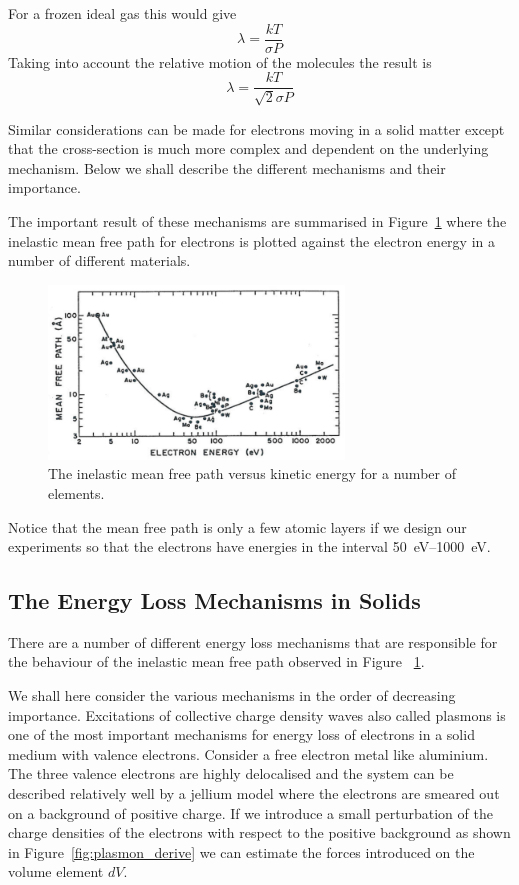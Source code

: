 For a frozen ideal gas this would give
\begin{equation}
\lambda = \frac{kT}{\sigma P}
\end{equation}
Taking into account the relative motion of the molecules the result is
\begin{equation}
\lambda = \frac{kT}{\sqrt{2} \sigma P}
\end{equation}

Similar considerations can be made for electrons moving in a solid matter except that the cross-section is much more complex and dependent on the underlying mechanism. Below we shall describe the different mechanisms and their importance.

The important result of these mechanisms are summarised in Figure~\ref{fig:mean_free_path} where the inelastic mean free path for electrons is plotted against the electron energy in a number of different materials.

\begin{figure}[htbp]
\centering
\includegraphics[width=0.7\textwidth]{figures/02_06}
\caption{The inelastic mean free path versus kinetic energy for a number of elements.}
\label{fig:mean_free_path}
\end{figure}

Notice that the mean free path is only a few atomic layers if we design our experiments so that the electrons have energies in the interval \SIrange{50}{1000}{\electronvolt}.

\subsection{The Energy Loss Mechanisms in Solids}
There are a number of different energy loss mechanisms that are responsible for the behaviour of the inelastic mean free path observed in Figure ~\ref{fig:mean_free_path}.

We shall here consider the various mechanisms in the order of decreasing importance. Excitations of collective charge density waves also called plasmons is one of the most important mechanisms for energy loss of electrons in a solid medium with valence electrons. Consider a free electron metal like aluminium. The three valence electrons are highly delocalised and the system can be described relatively well by a jellium model where the electrons are smeared out on a background of positive charge. If we introduce a small perturbation of the charge densities of the electrons with respect to the positive background as shown in Figure~\ref{fig:plasmon_derive} we can estimate the forces introduced on the volume element $dV$.

